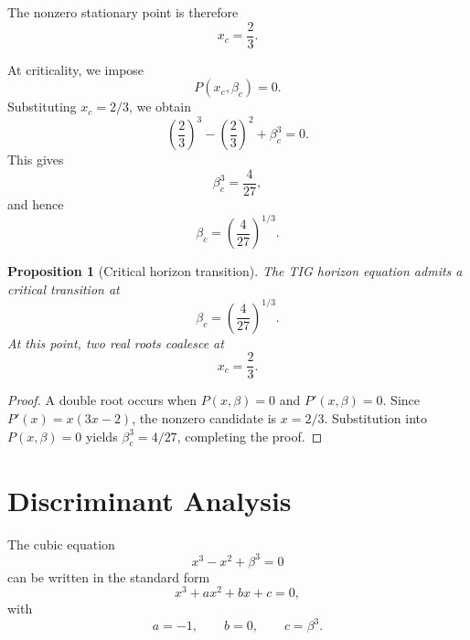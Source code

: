 \documentclass[11pt,a4paper]{article}
\newtheorem{proposition}{Proposition}
\begin{document}
The nonzero stationary point is therefore
\begin{equation}
x_c=\frac{2}{3}.
\label{eq:critical_x}
\end{equation}

At criticality, we impose
\begin{equation}
P(x_c,\beta_c)=0.
\end{equation}
Substituting \(x_c=2/3\), we obtain
\begin{equation}
\left(\frac{2}{3}\right)^3
-
\left(\frac{2}{3}\right)^2
+
\beta_c^3
=0.
\end{equation}
This gives
\begin{equation}
\beta_c^3=\frac{4}{27},
\label{eq:beta_c_cubed}
\end{equation}
and hence
\begin{equation}
\beta_c=\left(\frac{4}{27}\right)^{1/3}.
\label{eq:beta_c}
\end{equation}

\begin{proposition}[Critical horizon transition]
The TIG horizon equation admits a critical transition at
\begin{equation}
\beta_c=\left(\frac{4}{27}\right)^{1/3}.
\end{equation}
At this point, two real roots coalesce at
\begin{equation}
x_c=\frac{2}{3}.
\end{equation}
\end{proposition}

\begin{proof}
A double root occurs when \(P(x,\beta)=0\) and \(P'(x,\beta)=0\). Since
\(P'(x)=x(3x-2)\), the nonzero candidate is \(x=2/3\). Substitution into
\(P(x,\beta)=0\) yields \(\beta_c^3=4/27\), completing the proof.
\end{proof}

\section{Discriminant Analysis}

The cubic equation
\begin{equation}
x^3-x^2+\beta^3=0
\end{equation}
can be written in the standard form
\begin{equation}
x^3+ax^2+bx+c=0,
\end{equation}
with
\begin{equation}
a=-1,\qquad b=0,\qquad c=\beta^3.
\end{equation}
\end{document}
